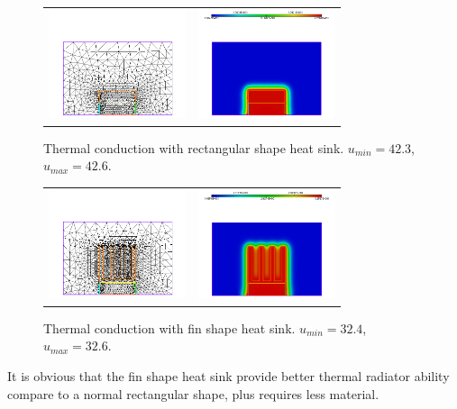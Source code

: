 \begin{figure}[ht]
	\centering
	\begin{tabular}{c c}
		\includegraphics[width=4cm]{recsinkc} & \includegraphics[width=4cm]{recsinka}
	\end{tabular}
	\caption{Thermal conduction with rectangular shape heat sink. $u_{min}=42.3$, $u_{max}=42.6$.}
\end{figure}
\begin{figure}[ht]
	\centering
	\begin{tabular}{c c}
		\includegraphics[width=4cm]{platec} & \includegraphics[width=4cm]{plateb}
	\end{tabular}
	\caption{Thermal conduction with fin shape heat sink. $u_{min}=32.4$, $u_{max}=32.6$.}
\end{figure}
It is obvious that the fin shape heat sink provide better thermal radiator ability compare to a normal rectangular shape, plus requires less material.
